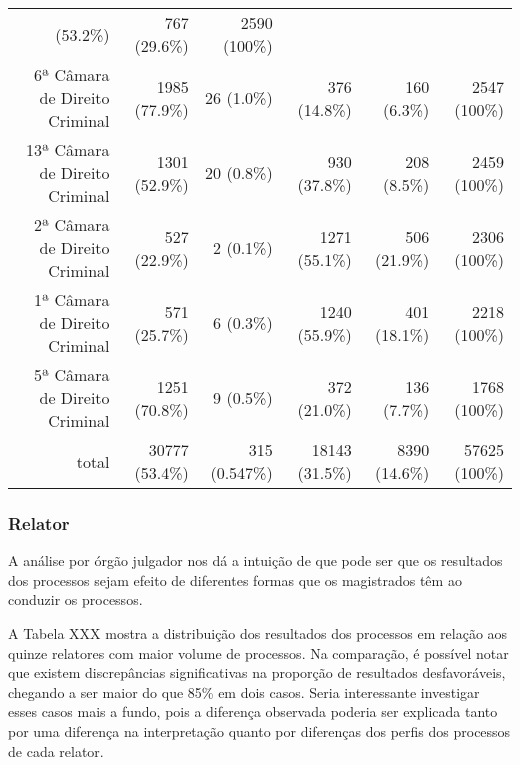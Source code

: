 \documentclass[10pt,]{article}
\begin{document}
\begin{longtable}[c]{@{}rrrrrr@{}}
(53.2\%) & 767 (29.6\%) & 2590 (100\%)\tabularnewline
6ª Câmara de Direito Criminal & 1985 (77.9\%) & 26 (1.0\%) & 376
(14.8\%) & 160 (6.3\%) & 2547 (100\%)\tabularnewline
13ª Câmara de Direito Criminal & 1301 (52.9\%) & 20 (0.8\%) & 930
(37.8\%) & 208 (8.5\%) & 2459 (100\%)\tabularnewline
2ª Câmara de Direito Criminal & 527 (22.9\%) & 2 (0.1\%) & 1271 (55.1\%)
& 506 (21.9\%) & 2306 (100\%)\tabularnewline
1ª Câmara de Direito Criminal & 571 (25.7\%) & 6 (0.3\%) & 1240 (55.9\%)
& 401 (18.1\%) & 2218 (100\%)\tabularnewline
5ª Câmara de Direito Criminal & 1251 (70.8\%) & 9 (0.5\%) & 372 (21.0\%)
& 136 (7.7\%) & 1768 (100\%)\tabularnewline
total & 30777 (53.4\%) & 315 (0.547\%) & 18143 (31.5\%) & 8390 (14.6\%)
& 57625 (100\%)\tabularnewline
\bottomrule
\end{longtable}

\subsubsection{Relator}\label{relator}

A análise por órgão julgador nos dá a intuição de que pode ser que os
resultados dos processos sejam efeito de diferentes formas que os
magistrados têm ao conduzir os processos.

A Tabela XXX mostra a distribuição dos resultados dos processos em
relação aos quinze relatores com maior volume de processos. Na
comparação, é possível notar que existem discrepâncias significativas na
proporção de resultados desfavoráveis, chegando a ser maior do que 85\%
em dois casos. Seria interessante investigar esses casos mais a fundo,
pois a diferença observada poderia ser explicada tanto por uma diferença
na interpretação quanto por diferenças dos perfis dos processos de cada
relator.
\end{document}
